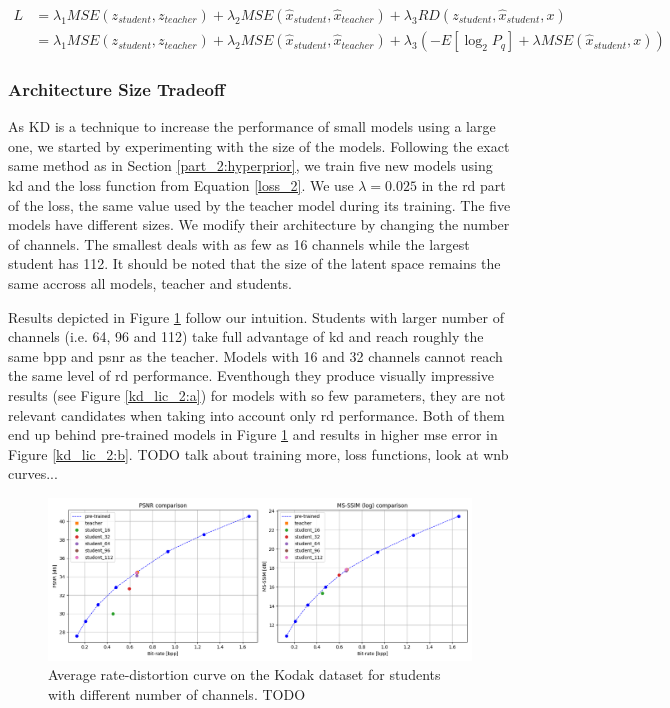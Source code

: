 \begin{align}
    L &= \lambda_{1} MSE(z_{student}, z_{teacher}) + \lambda_{2} MSE(\hat{x}_{student}, \hat{x}_{teacher}) + \lambda_{3} RD(z_{student}, \hat{x}_{student}, x)\label{loss_2}\\
      &= \lambda_{1} MSE(z_{student}, z_{teacher}) + \lambda_{2} MSE(\hat{x}_{student}, \hat{x}_{teacher}) + \lambda_{3} (-E[\log_{2}P_{q}] + \lambda MSE(\hat{x}_{student}, x)) \nonumber
\end{align}

\subsubsection{Architecture Size Tradeoff}
As \acrshort{KD} is a technique to increase the performance of small models using a large one, we started by experimenting with the size of the models. Following the exact same method as in Section \ref{part_2:hyperprior}, we train five new models using \acrshort{kd} and the loss function from Equation \ref{loss_2}. We use \(\lambda = 0.025\) in the \acrshort{rd} part of the loss, the same value used by the teacher model during its training. The five models have different sizes. We modify their architecture by changing the number of channels. The smallest deals with as few as 16 channels while the largest student has 112. It should be noted that the size of the latent space remains the same accross all models, teacher and students.

Results depicted in Figure \ref{kd_lic_1} follow our intuition. Students with larger number of channels (i.e. 64, 96 and 112) take full advantage of \acrshort{kd} and reach roughly the same \acrshort{bpp} and \acrshort{psnr} as the teacher. Models with 16 and 32 channels cannot reach the same level of \acrshort{rd} performance. Eventhough they produce visually impressive results (see Figure \ref{kd_lic_2:a}) for models with so few parameters, they are not relevant candidates when taking into account only \acrshort{rd} performance. Both of them end up behind pre-trained models in Figure \ref{kd_lic_1} and results in higher \acrshort{mse} error in Figure \ref{kd_lic_2:b}. TODO talk about training more, loss functions, look at wnb curves...

\begin{figure}
    \centering
    \includegraphics[width=15cm]{img/kd_lic_1.png}
    \caption[Average rate-distortion curve on the Kodak dataset for students with different number of channels.]{Average rate-distortion curve on the Kodak dataset for students with different number of channels. TODO}
    \label{kd_lic_1}
\end{figure}

